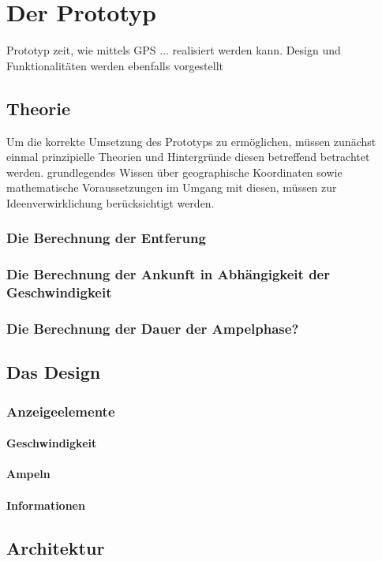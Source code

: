 \chapter{Der Prototyp}
Prototyp zeit, wie mittels GPS ... realisiert werden kann.
Design und Funktionalitäten werden ebenfalls vorgestellt
\section{Theorie}
Um die korrekte Umsetzung des Prototyps zu ermöglichen, müssen zunächst einmal prinzipielle
Theorien und Hintergründe diesen betreffend betrachtet werden.
grundlegendes Wissen über geographische Koordinaten sowie mathematische Voraussetzungen im Umgang mit diesen, müssen zur Ideenverwirklichung berücksichtigt werden.
\subsection{Die Berechnung der Entferung}
\subsection{Die Berechnung der Ankunft in Abhängigkeit der Geschwindigkeit}
\subsection{Die Berechnung der Dauer der Ampelphase?}
\section{Das Design}
\subsection{Anzeigeelemente}
\subsubsection{Geschwindigkeit}
\subsubsection{Ampeln}
\subsubsection{Informationen}
\section{Architektur}
